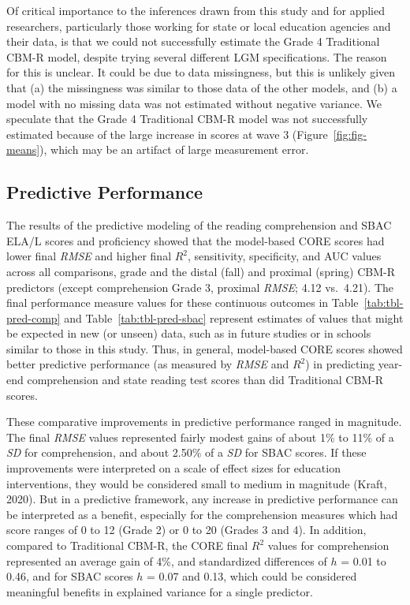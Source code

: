\documentclass[
  english,
  man, fleqn, noextraspace]{apa6}
\begin{document}
Of critical importance to the inferences drawn from this study and for applied researchers, particularly those working for state or local education agencies and their data, is that we could not successfully estimate the Grade 4 Traditional CBM-R model, despite trying several different LGM specifications. The reason for this is unclear. It could be due to data missingness, but this is unlikely given that (a) the missingness was similar to those data of the other models, and (b) a model with no missing data was not estimated without negative variance. We speculate that the Grade 4 Traditional CBM-R model was not successfully estimated because of the large increase in scores at wave 3 (Figure~\ref{fig:fig-means}), which may be an artifact of large measurement error.

\hypertarget{predictive-performance}{%
\subsection{Predictive Performance}\label{predictive-performance}}

The results of the predictive modeling of the reading comprehension and SBAC ELA/L scores and proficiency showed that the model-based CORE scores had lower final \emph{RMSE} and higher final \(R^2\), sensitivity, specificity, and AUC values across all comparisons, grade and the distal (fall) and proximal (spring) CBM-R predictors (except comprehension Grade 3, proximal \emph{RMSE}; 4.12 vs.~4.21). The final performance measure values for these continuous outcomes in Table~\ref{tab:tbl-pred-comp} and Table~\ref{tab:tbl-pred-sbac} represent estimates of values that might be expected in new (or unseen) data, such as in future studies or in schools similar to those in this study. Thus, in general, model-based CORE scores showed better predictive performance (as measured by \emph{RMSE} and \(R^2\)) in predicting year-end comprehension and state reading test scores than did Traditional CBM-R scores.

These comparative improvements in predictive performance ranged in magnitude. The final \emph{RMSE} values represented fairly modest gains of about 1\% to 11\% of a \emph{SD} for comprehension, and about 2.50\% of a \emph{SD} for SBAC scores. If these improvements were interpreted on a scale of effect sizes for education interventions, they would be considered small to medium in magnitude (Kraft, 2020). But in a predictive framework, any increase in predictive performance can be interpreted as a benefit, especially for the comprehension measures which had score ranges of 0 to 12 (Grade 2) or 0 to 20 (Grades 3 and 4). In addition, compared to Traditional CBM-R, the CORE final \(R^2\) values for comprehension represented an average gain of 4\%, and standardized differences of \(h\) = 0.01 to 0.46, and for SBAC scores \(h\) = 0.07 and 0.13, which could be considered meaningful benefits in explained variance for a single predictor.
\end{document}
